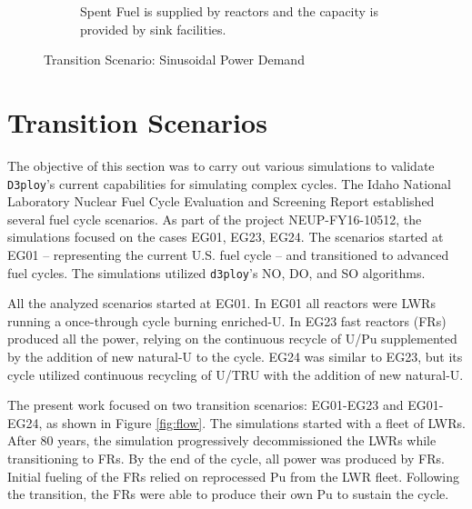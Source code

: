 \documentclass[11pt,letterpaper]{article}
\begin{document}
\begin{figure}[!htbp]
\begin{subfigure}[t]{0.65\textwidth}
        \caption{Spent Fuel is supplied by reactors and the capacity is provided by sink facilities.}
        \label{fig:sinetransition-spentfuel}
    \end{subfigure}
    \caption{Transition Scenario: Sinusoidal Power Demand}
\end{figure}

\pagebreak
\section{Transition Scenarios}

The objective of this section was to carry out various simulations to validate 
\texttt{D3ploy}'s current capabilities for simulating complex cycles.
The Idaho National Laboratory Nuclear Fuel Cycle Evaluation and Screening Report \cite{wigeland_nuclear_2014} established several fuel cycle scenarios.
As part of the project NEUP-FY16-10512, the simulations focused on the cases EG01, EG23, EG24. The scenarios started at EG01 -- representing the current U.S. fuel cycle -- and transitioned to advanced fuel cycles.
The simulations utilized \texttt{d3ploy}'s NO, DO, and SO algorithms.

All the analyzed scenarios started at EG01. In EG01 all reactors were LWRs running a  once-through cycle burning enriched-U.
In EG23 fast reactors (FRs) produced all the power, relying on the continuous recycle of U/Pu supplemented by the addition of new natural-U to the cycle.
EG24 was similar to EG23, but its cycle utilized continuous recycling of U/TRU with the addition of new natural-U.

The present work focused on two transition scenarios: EG01-EG23 and EG01-EG24,  as shown in Figure \ref{fig:flow}. The simulations started with a fleet of LWRs. After 80 years, the simulation progressively decommissioned the LWRs while transitioning to FRs. By the end of the cycle, all power was produced by FRs. Initial fueling of the FRs relied on reprocessed Pu from the LWR fleet. Following the transition, the FRs were able to produce their own Pu to sustain the cycle.
\end{document}
